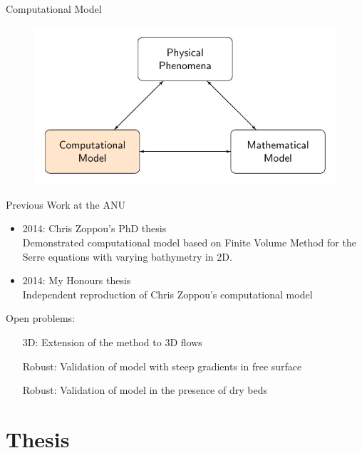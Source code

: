 \documentclass[handout]{beamer}
\begin{document}
\begin{frame}{Computational Model}
	\begin{figure}
		\includegraphics[width=\textwidth]{./Pics/ModelDiagrams/FlowChartHigh3O.pdf}
	\end{figure}
\end{frame}
\begin{frame}{Previous Work at the ANU}
	\begin{itemize}
		\item 2014: Chris Zoppou's PhD thesis  \\
			Demonstrated computational model based on Finite Volume Method for the Serre equations with varying bathymetry in 2D.
		\item 2014: My Honours thesis \\
			Independent reproduction of Chris Zoppou's computational model
	\end{itemize}
	\pause
	Open problems:
	\begin{itemize}
		\item[3D:] Extension of the method to 3D flows
		\item[Robust:] Validation of model with steep gradients in free surface
		\item[Robust:] Validation of model in the presence of dry beds
	\end{itemize}	
\end{frame}



\section{Thesis}
\end{document}
